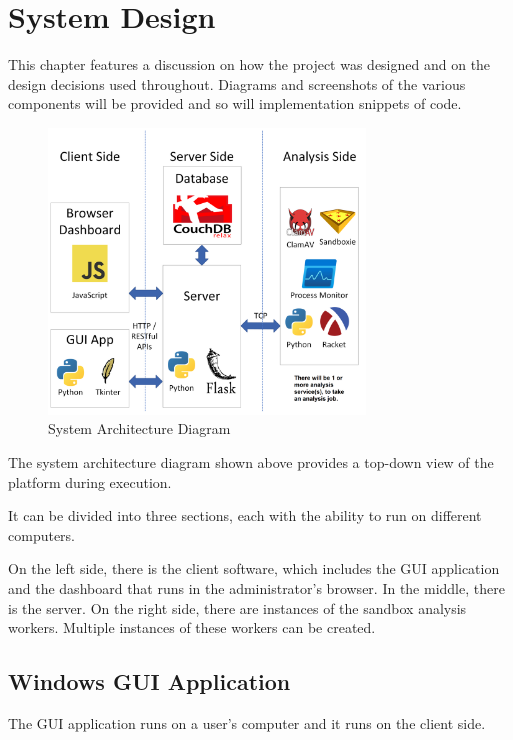 \chapter{System Design}

This chapter features a discussion on how the project was designed
and on the design decisions used throughout.
Diagrams and screenshots of the various components will be provided
and so will implementation snippets of code.

\begin{figure}[h!]
    \centering
    \includegraphics[width=0.75\textwidth]{images/diagrams/architecture}
    \caption{System Architecture Diagram}
    \label{image:sysArchitecture}
\end{figure}

The system architecture diagram shown above provides
a top-down view of the platform during execution.

It can be divided into three sections,
each with the ability to run on different computers.

On the left side, there is the client software,
which includes the GUI application and the dashboard
that runs in the administrator's browser.
In the middle, there is the server. On the right side,
there are instances of the sandbox analysis workers.
Multiple instances of these workers can be created.

\section{Windows GUI Application}
The GUI application runs on a user's computer
and it runs on the client side.

